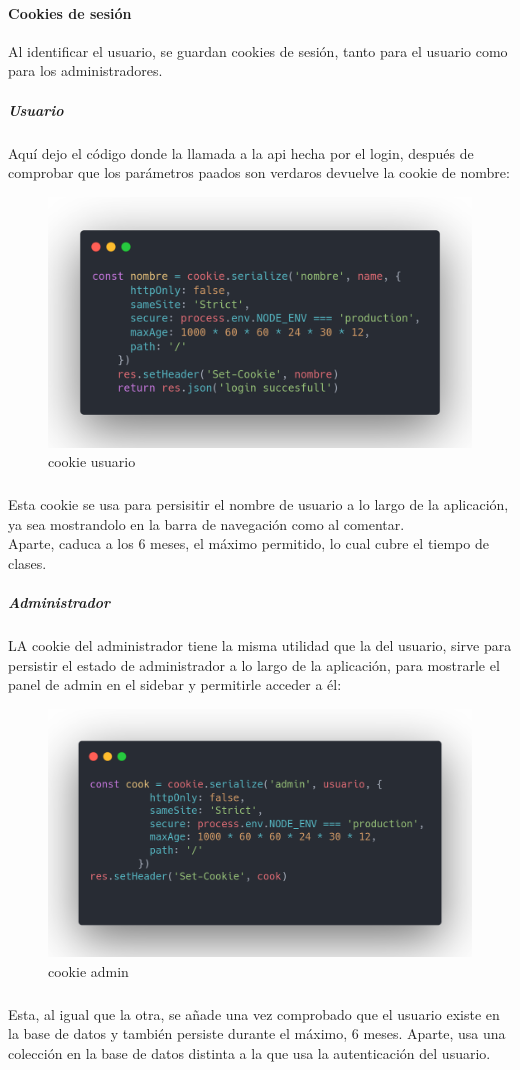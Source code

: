 \documentclass[a4paper]{article}
\begin{document}
\paragraph{Cookies de sesión}
Al identificar el usuario, se guardan cookies de sesión, tanto para el usuario como para los administradores.
\subparagraph{Usuario}
Aquí dejo el código donde la llamada a la api hecha por el login, después de comprobar que los parámetros
paados son verdaros devuelve la cookie de nombre:
\begin{figure}[ht]
   \includegraphics[width=\linewidth]{./assets/cookie-usuario.png}
   \centering
   \caption{cookie usuario}
   \label{fig:cookie-usuario}
\end{figure}
 \subparagraph{}
 Esta cookie se usa para persisitir el nombre de usuario a lo largo de la aplicación,
 ya sea mostrandolo en la barra de navegación como al comentar.\\
 Aparte, caduca a los 6 meses, el máximo permitido, lo cual cubre el tiempo de clases.
 \subparagraph{Administrador}
 LA cookie del administrador tiene la misma utilidad que la del usuario, sirve para 
 persistir el estado de administrador a lo largo de la aplicación, para mostrarle 
 el panel de admin en el sidebar y permitirle acceder a él:
 \begin{figure}[ht]
   \includegraphics[width=\linewidth]{./assets/cookie-admin.png}
   \centering
   \caption{cookie admin}
   \label{fig:cookie-admin}
\end{figure}
\newpage
\subparagraph{}
Esta, al igual que la otra, se añade una vez comprobado que el usuario existe en 
la base de datos y también persiste durante el máximo, 6 meses. Aparte, usa una 
colección en la base de datos distinta a la que usa la autenticación del usuario.
\end{document}
